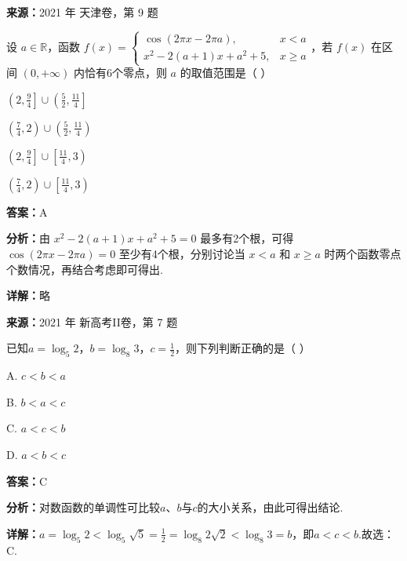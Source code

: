 \begin{question}[points=5]
\textbf{来源：}2021 年 天津卷，第 9 题\par
设 $a \in \mathbb{R}$，函数 $f(x) = \begin{cases} \cos(2\pi x - 2\pi a), & x < a \\ x^2 - 2(a+1)x + a^2 + 5, & x \ge a \end{cases}$，若 $f(x)$ 在区间 $(0, +\infty)$ 内恰有6个零点，则 $a$ 的取值范围是（   ）
\begin{choices}
  \item $\left(2, \frac{9}{4}\right] \cup \left(\frac{5}{2}, \frac{11}{4}\right]$
  \item $\left(\frac{7}{4}, 2\right) \cup \left(\frac{5}{2}, \frac{11}{4}\right)$
  \item $\left(2, \frac{9}{4}\right] \cup \left[\frac{11}{4}, 3\right)$
  \item $\left(\frac{7}{4}, 2\right) \cup \left[\frac{11}{4}, 3\right)$
\end{choices}
\begin{solution}
\textbf{答案：}A

\textbf{分析：}由 $x^2 - 2(a+1)x + a^2 + 5 = 0$ 最多有2个根，可得 $\cos(2\pi x - 2\pi a)=0$ 至少有4个根，分别讨论当 $x < a$ 和 $x \ge a$ 时两个函数零点个数情况，再结合考虑即可得出.

\textbf{详解：}略
\end{solution}
\end{question}

\begin{question}[points=5]
\textbf{来源：}2021 年 新高考II卷，第 7 题\par
已知$a=\log_5 2$，$b=\log_8 3$，$c=\frac{1}{2}$，则下列判断正确的是（ ）
\begin{choices}
  \item A. $c<b<a$
  \item B. $b<a<c$
  \item C. $a<c<b$
  \item D. $a<b<c$
\end{choices}
\begin{solution}
\textbf{答案：}C

\textbf{分析：}对数函数的单调性可比较$a$、$b$与$c$的大小关系，由此可得出结论.

\textbf{详解：}$a=\log_5 2<\log_5 \sqrt{5}=\frac{1}{2}=\log_8 2\sqrt{2}<\log_8 3=b$，即$a<c<b$.故选：C.
\end{solution}
\end{question}

